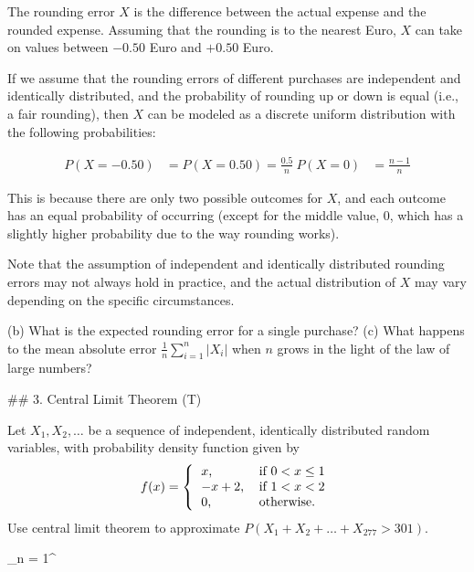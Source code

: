 \documentclass[20pt]{extbook}
\begin{document}
The rounding error $X$ is the difference between the actual expense and the rounded expense. Assuming that the rounding is to the nearest Euro, $X$ can take on values between $-0.50$ Euro and $+0.50$ Euro.

If we assume that the rounding errors of different purchases are independent and identically distributed, and the probability of rounding up or down is equal (i.e., a fair rounding), then $X$ can be modeled as a discrete uniform distribution with the following probabilities:

\begin{align*}
P(X=-0.50) &= P(X=0.50) = \frac{0.5}{n} \
P(X=0) &= \frac{n-1}{n}
\end{align*}

This is because there are only two possible outcomes for $X$, and each outcome has an equal probability of occurring (except for the middle value, 0, which has a slightly higher probability due to the way rounding works).

Note that the assumption of independent and identically distributed rounding errors may not always hold in practice, and the actual distribution of $X$ may vary depending on the specific circumstances.




(b) What is the expected rounding error for a single purchase?
(c) What happens to the mean absolute error $\frac{1}{n} \sum_{i=1}^n |X_i|$ when $n$ grows in the light of the law of large numbers?

## 3. Central Limit Theorem (T)

Let $X_1, X_2,\ldots$ be a sequence of independent, identically distributed random variables, with probability density function given by \begin{equation}
f(x) = \left\{\begin{tabular}{ll} $x$, & if $0<x\leq1$ \\ 
                                  $-x + 2$, & if $1<x<2$ \\
                                  0, & otherwise. \end{tabular}\right.
\end{equation} Use central limit theorem to approximate $P(X_1 +X_2 + \ldots + X_{277} > 301)$.

\cdot \sum_{n = 1}^{\infty} \rightarrow  
\end{document}
